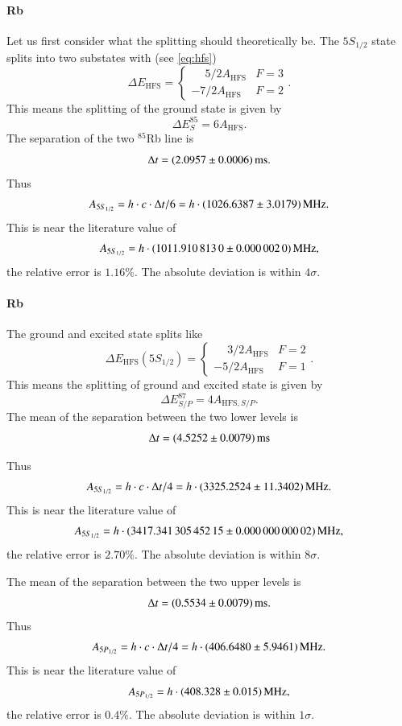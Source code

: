 \documentclass[11pt,a4paper,notitlepage]{scrartcl}
\begin{document}
\paragraph{Rb}
Let us first consider what the splitting should theoretically be. The $5S_{1/2}$ state splits into two substates with (see \eqref{eq:hfs}) $$\Delta E_\text{HFS}=\begin{cases}
	\phantom{-}5/2A_\text{HFS} & F=3\\
	-7/2A_\text{HFS} & F=2
\end{cases}.$$
This means the splitting of the ground state is given by $$\Delta E_S ^{85}=6A_\text{HFS}.$$
The separation of the two $^{85}$Rb line is $$\Delta t = \SI{2.0957\pm0.0006}{\milli\s}. $$ Thus $$ A_{5S_{1/2}}=h \cdot c\cdot\Delta t/6=h \cdot \SI{1026.6387\pm3.0179}{\mega\Hz}.$$
This is near the literature value \cite{85d} of $$A_{5S_{1/2}}=h \cdot \SI{1011.9108130\pm0.0000020}{\mega\Hz},$$ the relative error is $1.16\%$. The absolute deviation is within $4\sigma$.


\paragraph{Rb}
The ground and excited state splits like 
$$\Delta E_\text{HFS} (5S_{1/2})=\begin{cases}
	\phantom{-}3/2A_\text{HFS} & F=2\\
	-5/2A_\text{HFS} & F=1
\end{cases}.$$
This means the splitting of ground and excited state is given by
$$\Delta E_{S/P} ^{87}=4A_{\text{HFS},S/P}.$$
The mean of the separation between the two lower levels is $$\Delta t = \SI{4.5252\pm0.0079}{\milli\s} $$

 Thus $$ A_{5S_{1/2}}=h \cdot c\cdot\Delta t/4=h \cdot \SI{3325.2524\pm11.3402}{\mega\Hz}.$$
 This is near the literature value \cite{87d} of $$A_{5S_{1/2}}=h \cdot \SI{3417.34130545215\pm0.00000000002}{\mega\Hz},$$ the relative error is $2.70\%$. The absolute deviation is within $8\sigma$.
 
 The mean of the separation between the two upper levels is $$\Delta t=\SI{0.5534\pm0.0079}{\milli\s}.$$
  Thus $$ A_{5P_{1/2}}=h \cdot c\cdot\Delta t/4=h \cdot \SI{406.6480\pm5.9461}{\mega\Hz}.$$
 This is near the literature value \cite{87d} of$$A_{5P_{1/2}}=h \cdot \SI{408.328\pm0.015}{\mega\Hz},$$ the relative error is $0.4\%$. The absolute deviation is within $1\sigma$.
 
\end{document}
